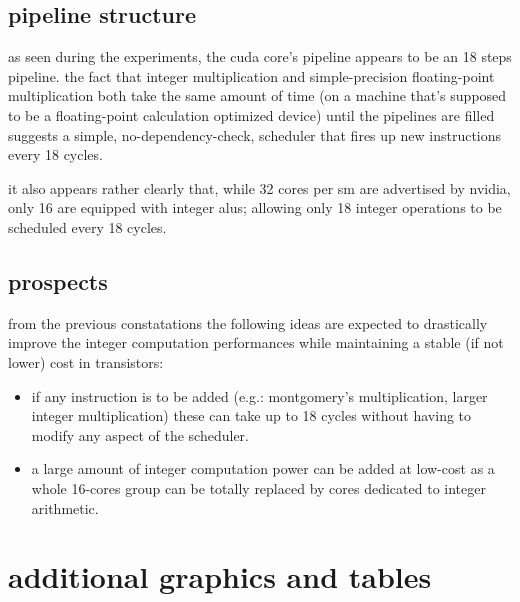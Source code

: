 \documentclass{report}
\begin{document}
    \subsection{pipeline structure}
    as seen during the experiments, the cuda core's pipeline appears to be an
    18 steps pipeline. the fact that integer multiplication and 
    simple-precision floating-point multiplication both take the same amount
    of time (on a machine that's supposed to be a floating-point calculation
    optimized device) until the pipelines are filled suggests a simple,
    no-dependency-check, scheduler that fires up new instructions every 18 cycles.

    it also appears rather clearly that, while 32 cores per sm are advertised by
    nvidia, only 16 are equipped with integer alus; allowing only 18 integer
    operations to be scheduled every 18 cycles.
    
    \subsection{prospects}
    from the previous constatations the following ideas are expected to drastically
    improve the integer computation performances while maintaining a stable (if not
    lower) cost in transistors:
    \begin{itemize}
        \item if any instruction is to be added (e.g.: montgomery's multiplication, larger integer multiplication) these can take up to 18 cycles without having to modify any aspect of the scheduler.
        \item a large amount of integer computation power can be added at low-cost as a whole 16-cores group can be totally replaced by cores dedicated to integer arithmetic.
    \end{itemize}
\section{additional graphics and tables}
\end{document}
